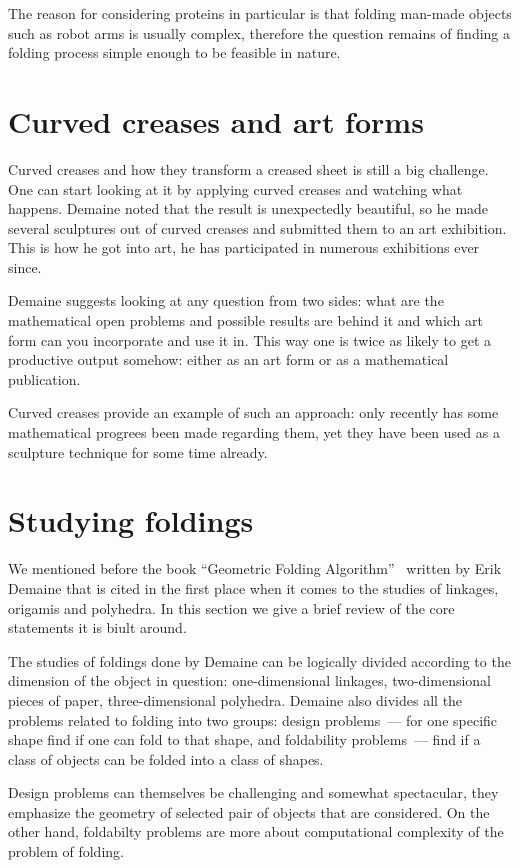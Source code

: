 \documentclass[a4paper,12pt]{article}
\begin{document}
The reason for considering proteins in particular is that folding man-made objects such as robot arms is usually complex, therefore the question remains of finding a folding process simple enough to be feasible in nature.

\section{Curved creases and art forms}

Curved creases and how they transform a creased sheet is still a big challenge. One can start looking at it by applying curved creases and watching what happens. Demaine noted that the result is unexpectedly beautiful, so he made several sculptures out of curved creases and submitted them to an art exhibition. This is how he got into art, he has participated in numerous exhibitions ever since.

Demaine suggests looking at any question from two sides: what are the mathematical open problems and possible results are behind it and which art form can you incorporate and use it in. This way one is twice as likely to get a productive output somehow: either as an art form or as a mathematical publication.

Curved creases provide an example of such an approach: only recently has some mathematical progrees been made regarding them, yet they have been used as a sculpture technique for some time already.

\section{Studying foldings}

We mentioned before the book “Geometric Folding Algorithm”~\cite{DO07} written by Erik Demaine that is cited in the first place when it comes to the studies of linkages, origamis and polyhedra. In this section we give a brief review of the core statements it is biult around.

The studies of foldings done by Demaine can be logically divided according to the dimension of the object in question: one-dimensional linkages, two-dimensional pieces of paper, three-dimensional polyhedra. Demaine also divides all the problems related to folding into two groups: design problems~— for one specific shape find if one can fold to that shape, and foldability problems~— find if a class of objects can be folded into a class of shapes.

Design problems can themselves be challenging and somewhat spectacular, they emphasize the geometry of selected pair of objects that are considered. On the other hand, foldabilty problems are more about computational complexity of the problem of folding.
\end{document}
